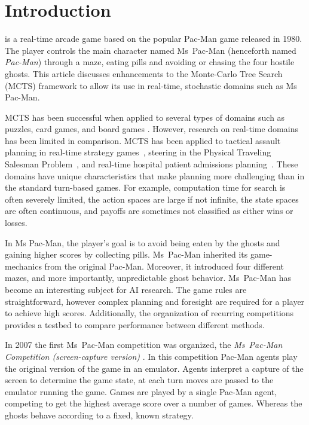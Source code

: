 \documentclass[journal]{IEEEtran}
\begin{document}
\section{Introduction}
 is a real-time arcade game based on the popular Pac-Man game released in 1980. The player controls the main character named Ms~Pac-Man (henceforth named \emph{Pac-Man}) through a maze, eating pills and avoiding or chasing the four hostile ghosts. This article discusses enhancements to the Monte-Carlo Tree Search (MCTS) \cite{kocsis2006bandit, coulom2007efficient} framework to allow its use in real-time, stochastic domains such as Ms Pac-Man. 

MCTS has been successful when applied to several types of domains such as puzzles, card games, and board games \cite{brownesurvey}. However, research on real-time domains has been limited in comparison. MCTS has been applied to tactical assault planning in real-time strategy games~\cite{balla2009uct}, steering in the Physical Traveling Salesman Problem~\cite{powleytsp}, and real-time hospital patient admissions planning~\cite{zhu13realtime}. These domains have unique characteristics that make planning more challenging than in the standard turn-based games. For example, computation time for search is often severely limited, the action spaces are large if not infinite, the state spaces are often continuous, and payoffs are sometimes not classified as either wins or losses. 

In Ms Pac-Man, the player's goal is to avoid being eaten by the ghosts and gaining higher scores by collecting pills. Ms~Pac-Man inherited its game-mechanics from the original Pac-Man. Moreover, it introduced four different mazes, and more importantly, unpredictable ghost behavior. Ms~Pac-Man has become an interesting subject for AI research. The game rules are straightforward, however complex planning and foresight are required for a player to achieve high scores. Additionally, the organization of recurring competitions provides a testbed to compare performance between different methods.

In 2007 the first Ms~Pac-Man competition was organized, the \emph{Ms~Pac-Man Competition (screen-capture version)} \cite{mspacmanscreencap}. In this competition Pac-Man agents play the original version of the game in an emulator. Agents interpret a capture of the screen to determine the game state, at each turn moves are passed to the emulator running the game. Games are played by a single Pac-Man agent, competing to get the highest average score over a number of games. Whereas the ghosts behave according to a fixed, known strategy.
\end{document}
